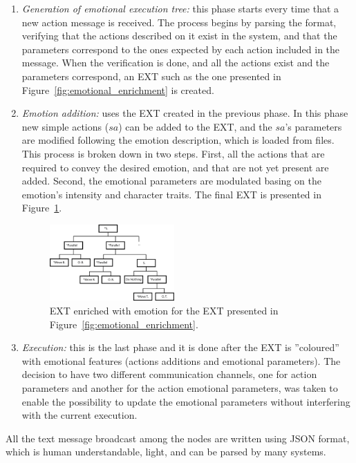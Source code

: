 \begin{enumerate}
	\item \textit{Generation of emotional execution tree:} this phase starts every time that a new action message is received. The process begins by parsing the format, verifying that the actions described on it exist in the system, and that the parameters correspond to the ones expected by each action included in the message. 
When the verification is done, and all the actions exist and the parameters correspond, an EXT such as the one presented in Figure~\ref{fig:emotional_enrichment} is created.
	\item \textit{Emotion addition:} uses the EXT created in the previous phase. In this phase new simple actions ($sa$)
can be added to the EXT, and the $sa$'s parameters are modified following the emotion description, which is loaded from files. This process is broken down in two steps. First, all the actions that are required to convey the desired emotion, and that are not yet present are added. Second, the emotional parameters are modulated basing on the emotion's intensity and character traits. The final EXT is presented in Figure~\ref{fig:reference}.
	\begin{figure}
		\centering
	\includegraphics[width=0.45\textwidth]{./Images/exampleTreeE.png}
	\caption{EXT enriched with emotion for the EXT presented in Figure~\ref{fig:emotional_enrichment}.} 
	\label{fig:reference}
	\end{figure}
	\item \textit{Execution:} this is the last phase and it is done after the EXT is ''coloured'' with emotional features (actions additions and emotional parameters). The decision to have two different communication channels, one for action parameters and another for the action emotional parameters, was taken to enable the possibility to update the emotional parameters without interfering with the current execution. 
\end{enumerate}

All the text message broadcast among the nodes are written using JSON format, which is human understandable, light, and can be parsed by many systems.
 
